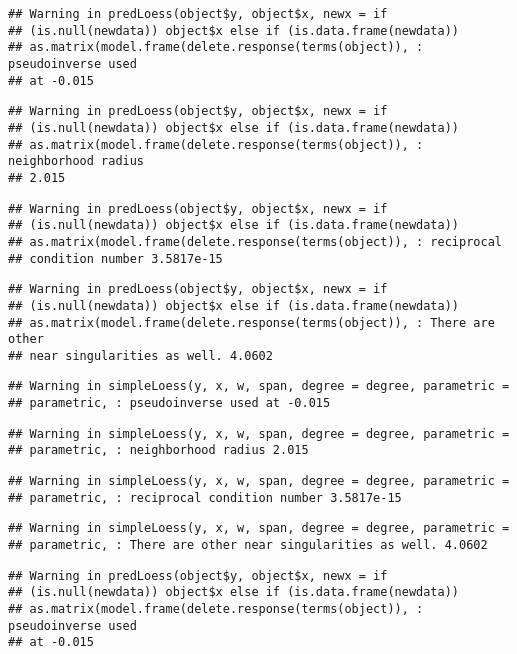 \documentclass[]{article}
\begin{document}
\begin{verbatim}
## Warning in predLoess(object$y, object$x, newx = if
## (is.null(newdata)) object$x else if (is.data.frame(newdata))
## as.matrix(model.frame(delete.response(terms(object)), : pseudoinverse used
## at -0.015
\end{verbatim}

\begin{verbatim}
## Warning in predLoess(object$y, object$x, newx = if
## (is.null(newdata)) object$x else if (is.data.frame(newdata))
## as.matrix(model.frame(delete.response(terms(object)), : neighborhood radius
## 2.015
\end{verbatim}

\begin{verbatim}
## Warning in predLoess(object$y, object$x, newx = if
## (is.null(newdata)) object$x else if (is.data.frame(newdata))
## as.matrix(model.frame(delete.response(terms(object)), : reciprocal
## condition number 3.5817e-15
\end{verbatim}

\begin{verbatim}
## Warning in predLoess(object$y, object$x, newx = if
## (is.null(newdata)) object$x else if (is.data.frame(newdata))
## as.matrix(model.frame(delete.response(terms(object)), : There are other
## near singularities as well. 4.0602
\end{verbatim}

\begin{verbatim}
## Warning in simpleLoess(y, x, w, span, degree = degree, parametric =
## parametric, : pseudoinverse used at -0.015
\end{verbatim}

\begin{verbatim}
## Warning in simpleLoess(y, x, w, span, degree = degree, parametric =
## parametric, : neighborhood radius 2.015
\end{verbatim}

\begin{verbatim}
## Warning in simpleLoess(y, x, w, span, degree = degree, parametric =
## parametric, : reciprocal condition number 3.5817e-15
\end{verbatim}

\begin{verbatim}
## Warning in simpleLoess(y, x, w, span, degree = degree, parametric =
## parametric, : There are other near singularities as well. 4.0602
\end{verbatim}

\begin{verbatim}
## Warning in predLoess(object$y, object$x, newx = if
## (is.null(newdata)) object$x else if (is.data.frame(newdata))
## as.matrix(model.frame(delete.response(terms(object)), : pseudoinverse used
## at -0.015
\end{verbatim}
\end{document}
